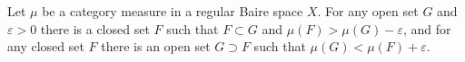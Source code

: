 Let $\mu$ be a category measure in a regular Baire space $X$. For any open set $G$ and $\varepsilon > 0$ there is a closed set $F$ such that $F \subset G$ and $\mu(F) > \mu(G) - \varepsilon$, and for any closed set $F$ there is an open set $G \supset F$ such that $\mu(G) < \mu(F) + \varepsilon$.
